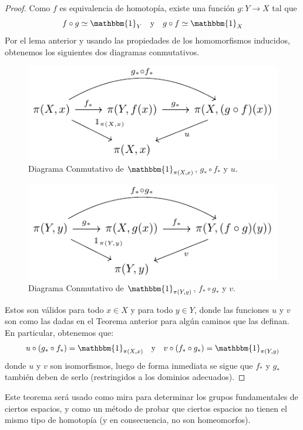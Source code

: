 \documentclass{article}
\theoremstyle{largebreak}
\newcommand\cf[3]{\ensuremath{#1:#2\rightarrow#3}}
\newcommand{\bbm}[1]{\mathbbm{#1}}
\begin{document}
    \begin{proof}

        Como $f$ es equivalencia de homotopía, existe una función $\cf{g}{Y}{X}$ tal que
        \begin{equation*}
            f\circ g\simeq\bbm{1}_Y\quad\textup{y}\quad g\circ f\simeq\bbm{1}_X
        \end{equation*}
        Por el lema anterior y usando las propiedades de los homomorfismos inducidos, obtenemos los siguientes dos diagramas conmutativos.

        \begin{figure}
            \begin{center}
                \includegraphics[scale=1.5]{images/fig_6.pdf}
            \end{center}
            \caption{Diagrama Conmutativo de $\bbm{1}_{\pi(X,x)}$, $g_*\circ f_*$ y $u$.}
        \end{figure}

        \begin{figure}
            \begin{center}
                \includegraphics[scale=1.5]{images/fig_7.pdf}
            \end{center}
            \caption{Diagrama Conmutativo de $\bbm{1}_{\pi(Y,y)}$, $f_*\circ g_*$ y $v$.}
        \end{figure}

        Estos son válidos para todo $x\in X$ y para todo $y\in Y$, donde las funciones $u$ y $v$ son como las dadas en el Teorema anterior para algún caminos que las definan. En particular, obtenemos que:
        \begin{equation*}
            u\circ (g_*\circ f_*) =\bbm{1}_{\pi(X,x)}\quad\textup{y}\quad v\circ (f_*\circ g_*)=\bbm{1}_{\pi(Y,y)}
        \end{equation*}
        donde $u$ y $v$ son isomorfismos, luego de forma inmediata se sigue que $f_*$ y $g_*$ también deben de serlo (restringidos a los dominios adecuados).
    \end{proof}

    Este teorema será usado como mira para determinar los grupos fundamentales de ciertos espacios, y como un método de probar que ciertos espacios no tienen el mismo tipo de homotopía (y en consecuencia, no son homeomorfos).
\end{document}
